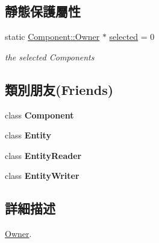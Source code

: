 \subsection*{靜態保護屬性}
\begin{DoxyCompactItemize}
\item 
static \hyperlink{class_magnum_1_1_component_1_1_owner}{Component\+::\+Owner} $\ast$ \hyperlink{class_magnum_1_1_component_1_1_owner_a9b9c76f12a399d31386b4606be7e448b}{selected} = 0\hypertarget{class_magnum_1_1_component_1_1_owner_a9b9c76f12a399d31386b4606be7e448b}{}\label{class_magnum_1_1_component_1_1_owner_a9b9c76f12a399d31386b4606be7e448b}

\begin{DoxyCompactList}\small\item\em the selected Components \end{DoxyCompactList}\end{DoxyCompactItemize}
\subsection*{類別朋友(Friends)}
\begin{DoxyCompactItemize}
\item 
class {\bfseries Component}\hypertarget{class_magnum_1_1_component_1_1_owner_a90717717700965c100968cff0188e244}{}\label{class_magnum_1_1_component_1_1_owner_a90717717700965c100968cff0188e244}

\item 
class {\bfseries Entity}\hypertarget{class_magnum_1_1_component_1_1_owner_a614439ccac0344926adc4c0165d64060}{}\label{class_magnum_1_1_component_1_1_owner_a614439ccac0344926adc4c0165d64060}

\item 
class {\bfseries Entity\+Reader}\hypertarget{class_magnum_1_1_component_1_1_owner_a56e67fba8094d0ad6c4e9a70157aeea0}{}\label{class_magnum_1_1_component_1_1_owner_a56e67fba8094d0ad6c4e9a70157aeea0}

\item 
class {\bfseries Entity\+Writer}\hypertarget{class_magnum_1_1_component_1_1_owner_a2530bdf39e07c94e0f4b49472a0ac288}{}\label{class_magnum_1_1_component_1_1_owner_a2530bdf39e07c94e0f4b49472a0ac288}

\end{DoxyCompactItemize}


\subsection{詳細描述}
\hyperlink{class_magnum_1_1_component_1_1_owner}{Owner}. 

